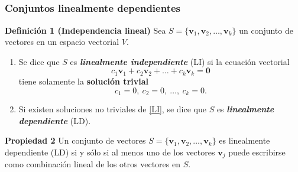 
\subsection{}

{\nologo
\begin{frame}\frametitle{Conjuntos linealmente dependientes}

\begin{block}{\textbf{Definición 1 (Independencia lineal)}}
	\justifying
	Sea $S=\{\mathbf{v}_1,\mathbf{v}_2,\hdots,\mathbf{v}_k\}$ un conjunto de vectores
	en un espacio vectorial $V$.
	
	\begin{enumerate}[$a$]%
		\item Se dice que $S$ es \textbf{\textit{linealmente independiente}} (LI) si
		la ecuación vectorial
		\begin{equation}\tag{1}
		c_1\mathbf{v}_1+c_2\mathbf{v}_2+\hdots+c_k\mathbf{v}_k = \mathbf{0}
		\end{equation}
		tiene solamente la \textbf{solución trivial}
		\[
		c_1 =0,\ c_2 =0,\ \hdots,\ c_k=0.
		\]
		
		\item Si existen soluciones no triviales de \eqref{LI}, se dice que $S$ es \textbf{\textit{linealmente dependiente}} (LD).
	\end{enumerate}		
\end{block}

\begin{prop}{\textbf{Propiedad 2}}\justifying
	Un conjunto de vectores $S=\{\mathbf{v}_1,\mathbf{v}_2,\hdots,\mathbf{v}_k\}$ es linealmente dependiente (LD)
	si y sólo si al menos uno de los vectores $\mathbf{v}_j$ puede escribirse como combinación lineal de los otros
	vectores en $S$.
\end{prop}

\end{frame}
}


\subsection{}

